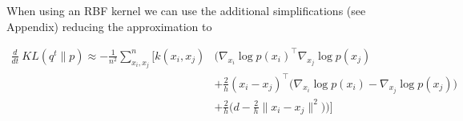 \documentclass{article}
\begin{document}
    When using an RBF kernel we can use the additional simplifications (see Appendix) reducing the approximation to

    \begin{align}
        \frac{d}{dt}\ KL( q^t \| p ) \approx - \frac{1}{n^2}\sum_{x_i,x_j}^n  \Bigg[
            k(x_i,x_j)& \Bigg( \nabla_{x_i} \log p(x_i)^\top \nabla_{x_j} \log p(x_j)  \\
                      &+ \frac{2}{h}(x_i - x_j)^\top \big(\nabla_{x_i} \log p(x_i)  - \nabla_{x_j} \log p(x_j) \big)\\
                    &+ \frac{2}{h}\Big( d - \frac{2}{h} \|x_i - x_j\|^2 \Big) \Bigg)
        \Bigg]
    \end{align} 


\end{document}

